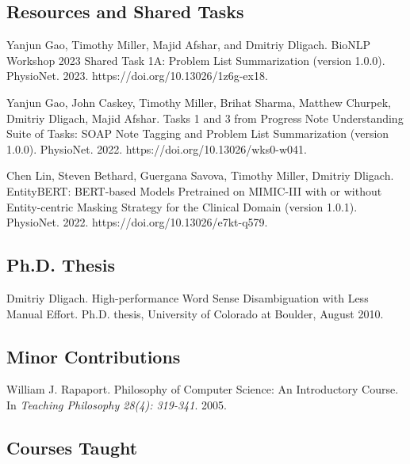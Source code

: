 \documentclass[letterpaper]{article}
\renewenvironment{itemize}{
  \begin{list}{}{
    \setlength{\leftmargin}{1.5em}
  }
}{
  \end{list}
}
\begin{document}
\subsection*{Resources and Shared Tasks}
\begin{itemize}
\item Yanjun Gao, Timothy Miller, Majid Afshar, and Dmitriy Dligach. BioNLP Workshop 2023 Shared Task 1A: Problem List Summarization (version 1.0.0). PhysioNet. 2023. https://doi.org/10.13026/1z6g-ex18.
\item Yanjun Gao, John Caskey, Timothy Miller, Brihat Sharma, Matthew Churpek, Dmitriy Dligach, Majid Afshar. Tasks 1 and 3 from Progress Note Understanding Suite of Tasks: SOAP Note Tagging and Problem List Summarization (version 1.0.0). PhysioNet. 2022. https://doi.org/10.13026/wks0-w041.
\item Chen Lin, Steven Bethard, Guergana Savova, Timothy Miller, Dmitriy Dligach. EntityBERT: BERT-based Models Pretrained on MIMIC-III with or without Entity-centric Masking Strategy for the Clinical Domain (version 1.0.1). PhysioNet. 2022. https://doi.org/10.13026/e7kt-q579.
\end{itemize}

\subsection*{Ph.D. Thesis}
\begin{itemize}
\item Dmitriy Dligach. High-performance Word Sense Disambiguation with Less Manual Effort. Ph.D. thesis, University of Colorado at Boulder, August 2010.
\end{itemize}

\subsection*{Minor Contributions}
\begin{itemize}
\item William J. Rapaport. Philosophy of Computer Science: An Introductory Course. In \emph {Teaching Philosophy 28(4): 319-341}. 2005.
\end{itemize}

\subsection*{Courses Taught}
\end{document}
